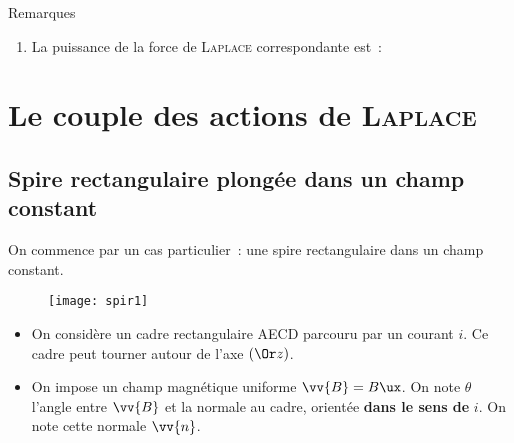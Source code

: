 \documentclass[../main/main.tex]{subfiles}
\begin{document}
\begin{rexem}{Remarques}
\begin{enumerate}[start=3]
		\item La puissance de la force de \textsc{Laplace} correspondante est~:
	\end{enumerate}
\end{rexem}

\section{Le couple des actions de \textsc{Laplace}}
\label{sec:lplcpl}

\subsection{Spire rectangulaire plongée dans un champ constant}
\label{ssec:lplcplspire}
On commence par un cas particulier~: une spire rectangulaire dans un champ
constant.
\begin{figure}[h!]
	\centering
	\texttt{[image: spir1]}
	\label{fig:spir1}
\end{figure}
\begin{itemize}[label=$\diamond$, leftmargin=10pt]
	\item On considère un cadre rectangulaire AECD parcouru par un courant $i$. Ce
	      cadre peut tourner autour de l'axe $(\Or z)$.
	\item On impose un champ magnétique uniforme $\vv{B} = B\ux$. On note $\theta$
	      l'angle entre $\vv{B}$ et la normale au cadre, orientée \textbf{dans le sens
		      de} $i$. On note cette normale $\vv{n}$.
\end{itemize}
\end{document}
